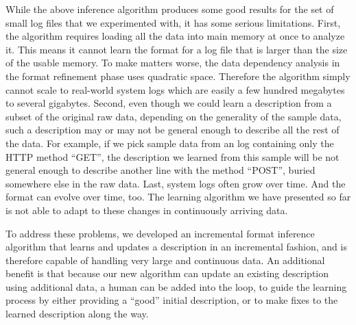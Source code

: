 While the above inference algorithm produces some good results for the
set of small log files that we experimented with, it has some serious
limitations. First, the algorithm requires loading all the data into main
memory at once to analyze it. This means it cannot learn the format for a log
file that is larger than the size of the usable memory. To make matters worse, the
data dependency analysis in the format refinement phase uses quadratic space. 
Therefore the algorithm simply cannot scale to real-world
system logs which are easily a few hundred megabytes to several gigabytes. 
Second, even though we could learn a description from a subset of the original
raw data, depending on the generality of the sample data, such a description
may or may not be general enough to describe all the rest of the data.
For example, if we pick sample data from an \ai{} log containing only the HTTP 
method ``GET'', the description we learned from this sample will be not general enough to 
describe another line with the method ``POST'', buried somewhere else in the
raw data. Last, system logs often grow over time. And the format can evolve 
over time, too. The learning algorithm we have presented so far is not able 
to adapt to these changes in continuously arriving data. 

To address these problems, we developed an incremental format inference
algorithm that learns and updates a description in an incremental fashion, and
is therefore capable of handling very large and continuous data. An additional
benefit is that because our new algorithm can update an existing description
using additional data, a human can be added into the loop, to 
guide the learning process by either providing a ``good'' initial description, 
or to make fixes to the learned description along the way.

%
%
%
%
